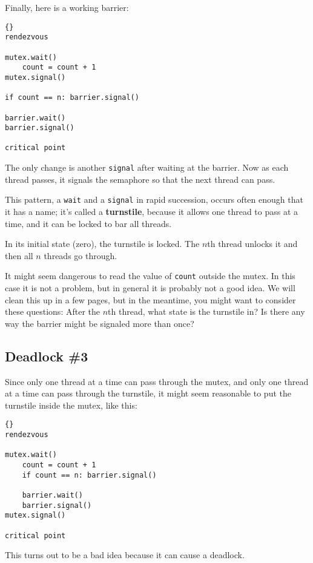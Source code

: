 \documentclass{book}
\newcommand{\clearemptydoublepage}{\newpage\cleardoublepage}
\begin{document}
Finally, here is a working barrier:

\begin{lstlisting}[title={Barrier solution}]{}
rendezvous

mutex.wait()
    count = count + 1
mutex.signal()

if count == n: barrier.signal()

barrier.wait()
barrier.signal()

critical point
\end{lstlisting}

The only change is another {\tt signal} after waiting
at the barrier.  Now as each thread passes, it signals the
semaphore so that the next thread can pass.

This pattern, a {\tt wait} and a {\tt signal} in rapid
succession, occurs often enough that it has a name;
it's called a {\bf turnstile}, because it allows one thread to pass
at a time, and it can be locked to bar all threads.

In its initial state (zero), the turnstile is locked.  The $n$th
thread unlocks it and then all $n$ threads go through.

It might seem dangerous to read the value of {\tt count} outside the
mutex.  In this case it is not a problem, but in general it is
probably not a good idea.  We will clean this up in a few pages, but
in the meantime, you might want to consider these questions: After the
$n$th thread, what state is the turnstile in?  Is there any way the
barrier might be signaled more than once?


\clearemptydoublepage
\subsection {Deadlock \#3}

Since only one thread at a time can pass through the
mutex, and only one thread at a time can pass through
the turnstile, it might seem reasonable to put the
turnstile inside the mutex, like this:

\begin{lstlisting}[title={Bad barrier solution}]{}
rendezvous

mutex.wait()
    count = count + 1
    if count == n: barrier.signal()

    barrier.wait()
    barrier.signal()
mutex.signal()

critical point
\end{lstlisting}

This turns out to be a bad idea because it can cause a
deadlock.
\end{document}
